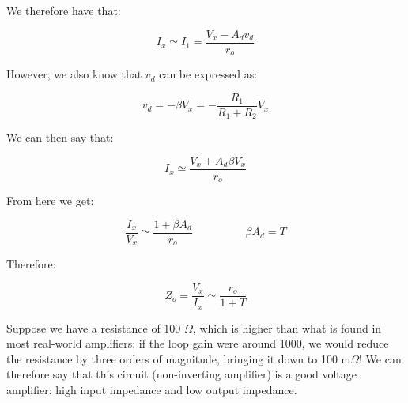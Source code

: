 \documentclass[../main.tex]{subfiles}
\begin{document}
We therefore have that:

\begin{equation}
	I_x \simeq I_1 = \frac{V_x - A_dv_d}{r_o}
\end{equation}

However, we also know that $v_d$ can be expressed as:

\begin{equation}
	v_d = - \beta V_x = -\frac{R_1}{R_1 + R_2} V_x
\end{equation}

We can then say that:


\begin{equation}
		I_x \simeq \frac{V_x + A_d \beta V_x}{r_o}
\end{equation}


From here we get:

\begin{equation}
	\frac{I_x}{V_x} \simeq \frac{1+ \beta A_d}{r_o} \hspace{2cm} \beta A_d = T
\end{equation}

Therefore:

\begin{equation}
	Z_o = \frac{V_x}{I_x} \simeq \frac{r_o}{1 + T}
\end{equation}



Suppose we have a resistance of 100 $\Omega$, which is higher than what is found in most real-world amplifiers; if the loop gain were around 1000, we would reduce the resistance by three orders of magnitude, bringing it down to 100 m$\Omega$! 
We can therefore say that this circuit (non-inverting amplifier) is a good voltage amplifier: high input impedance and low output impedance.
\end{document}
